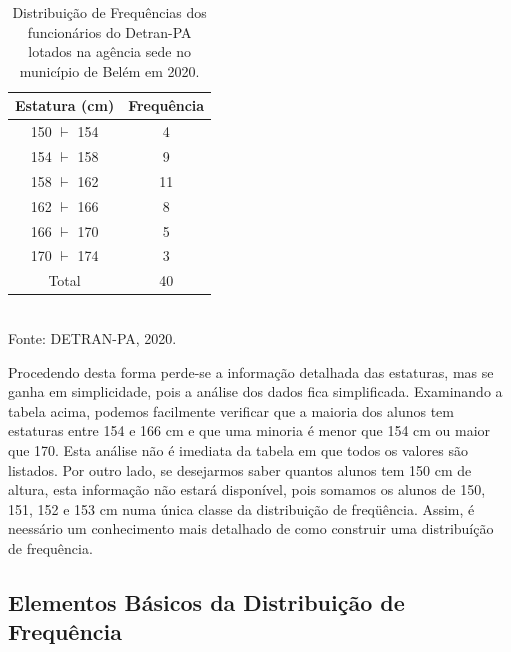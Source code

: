 \newpage

\begin{table}[!htb]
    \centering
    {
    \caption{Distribuição de Frequências dos funcionários do Detran-PA lotados na agência sede no município de Belém em 2020.}
    \label{estatura2}
    \vspace{0.2cm}
\begin{tabular}{c|c}
\hline\hline
Estatura (cm) & Frequência \\
  \hline\hline
  150 $\vdash$ 154 & 4  \\
  154 $\vdash$ 158 & 9 \\
  158 $\vdash$ 162 & 11  \\
  162 $\vdash$ 166 & 8  \\
  166 $\vdash$ 170 & 5  \\
  170 $\vdash$ 174 & 3  \\
  \hline\hline
  Total            & 40  \\
  \hline\hline
\end{tabular}}
\\
\hspace{-1.5cm}
Fonte: DETRAN-PA, 2020.
\end{table}



Procedendo desta forma perde-se a informação detalhada das
estaturas, mas se ganha em simplicidade, pois a análise dos dados
fica simplificada. Examinando a tabela acima, podemos facilmente
verificar que a maioria dos alunos tem estaturas entre 154 e 166
cm e que uma minoria é menor que 154 cm ou maior que 170. Esta
análise não é imediata da tabela em que todos os valores são
listados. Por outro lado, se desejarmos saber quantos alunos tem
150 cm de altura, esta informação não estará disponível, pois
somamos os alunos de 150, 151, 152 e 153 cm numa única classe da distribuição de freqüência. Assim, é neessário um conhecimento mais detalhado de como construir uma distribuíção de frequência.


\newpage


\subsection{Elementos Básicos da Distribuição de Frequência}


